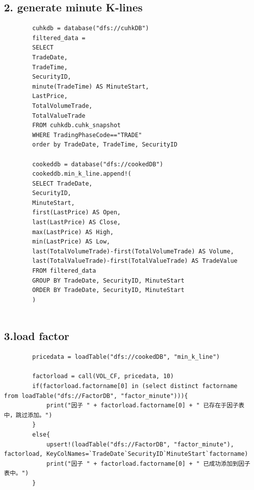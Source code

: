 \documentclass[10pt,a4paper]{article}
\begin{document}
	\subsection*{2. generate minute K-lines}
	\begin{lstlisting}
		cuhkdb = database("dfs://cuhkDB")
		filtered_data =
		SELECT 
		TradeDate,
		TradeTime,
		SecurityID,
		minute(TradeTime) AS MinuteStart, 
		LastPrice,
		TotalVolumeTrade,
		TotalValueTrade
		FROM cuhkdb.cuhk_snapshot
		WHERE TradingPhaseCode=="TRADE"
		order by TradeDate, TradeTime, SecurityID
		
		cookeddb = database("dfs://cookedDB")
		cookeddb.min_k_line.append!(
		SELECT TradeDate,
		SecurityID,
		MinuteStart,
		first(LastPrice) AS Open,
		last(LastPrice) AS Close, 
		max(LastPrice) AS High,
		min(LastPrice) AS Low,
		last(TotalVolumeTrade)-first(TotalVolumeTrade) AS Volume,
		last(TotalValueTrade)-first(TotalValueTrade) AS TradeValue
		FROM filtered_data
		GROUP BY TradeDate, SecurityID, MinuteStart
		ORDER BY TradeDate, SecurityID, MinuteStart
		)
		
	\end{lstlisting}
	
	\subsection*{3.load factor}
	\begin{lstlisting}
		pricedata = loadTable("dfs://cookedDB", "min_k_line")
		
		factorload = call(VOL_CF, pricedata, 10)
		if(factorload.factorname[0] in (select distinct factorname from loadTable("dfs://FactorDB", "factor_minute"))){
			print("因子 " + factorload.factorname[0] + " 已存在于因子表中，跳过添加。")
		}
		else{
			upsert!(loadTable("dfs://FactorDB", "factor_minute"), factorload, KeyColNames=`TradeDate`SecurityID`MinuteStart`factorname)
			print("因子 " + factorload.factorname[0] + " 已成功添加到因子表中。")
		}
	\end{lstlisting}
	
\end{document}
